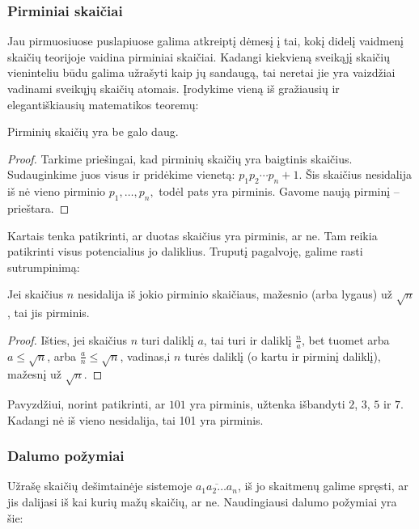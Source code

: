 \subsubsection{Pirminiai skaičiai}

Jau pirmuosiuose puslapiuose galima atkreiptį dėmesį į tai, kokį didelį vaidmenį
skaičių teorijoje vaidina pirminiai skaičiai. Kadangi kiekvieną sveikąjį
skaičių vieninteliu būdu galima užrašyti kaip jų sandaugą, tai neretai jie
yra vaizdžiai vadinami sveikųjų skaičių atomais. Įrodykime vieną iš
gražiausių ir elegantiškiausių matematikos teoremų:

\begin{thm} 
  Pirminių skaičių yra be galo daug.  
\end{thm} 

\begin{proof} 
  Tarkime priešingai, kad pirminių skaičių yra baigtinis skaičius.
  Sudauginkime juos visus ir pridėkime vienetą: $p_1p_2\cdots p_n + 1$. Šis
  skaičius nesidalija iš nė vieno pirminio $p_1, \dots, p_n,$ todėl pats
  yra pirminis. Gavome naują pirminį -- prieštara.
\end{proof}

Kartais tenka patikrinti, ar duotas skaičius yra pirminis, ar ne. Tam reikia
patikrinti visus potencialius jo daliklius. Truputį pagalvoję, galime rasti
sutrumpinimą: 

\begin{teig} 
  Jei skaičius $n$ nesidalija iš jokio pirminio skaičiaus, mažesnio (arba
  lygaus) už $\sqrt{n}$, tai jis pirminis.
\end{teig} 

\begin{proof}
  Išties, jei skaičius $n$ turi daliklį $a$, tai turi ir daliklį
  $\frac{n}{a}$, bet tuomet arba $a\leq \sqrt{n}$, arba $\frac{a}{n} \leq
  \sqrt{n}$, vadinas,i $n$ turės daliklį (o kartu ir pirminį daliklį),
  mažesnį už $\sqrt{n}$. 
\end{proof}

Pavyzdžiui, norint patikrinti, ar $101$ yra pirminis, užtenka išbandyti $2$,
$3$, $5$ ir $7$. Kadangi nė iš vieno nesidalija, tai 101 yra pirminis.

\subsubsection{Dalumo požymiai}

Užrašę skaičių dešimtainėje sistemoje $\overline{a_1a_2\dots a_n}$, iš jo
skaitmenų galime spręsti, ar jis dalijasi iš kai kurių mažų skaičių, ar ne.
Naudingiausi dalumo požymiai yra šie:

